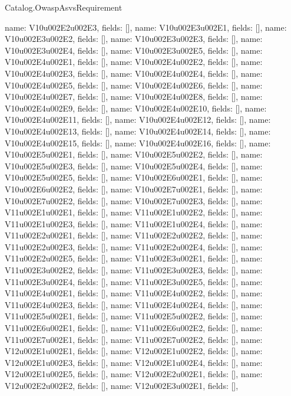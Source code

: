 \begin{lexlean}{Catalog.OwaspAsvsRequirement}
\begin{semanticmodule}
{    {name: V10u002E2u002E3, fields: []},
    {name: V10u002E3u002E1, fields: []},
    {name: V10u002E3u002E2, fields: []},
    {name: V10u002E3u002E3, fields: []},
    {name: V10u002E3u002E4, fields: []},
    {name: V10u002E3u002E5, fields: []},
    {name: V10u002E4u002E1, fields: []},
    {name: V10u002E4u002E2, fields: []},
    {name: V10u002E4u002E3, fields: []},
    {name: V10u002E4u002E4, fields: []},
    {name: V10u002E4u002E5, fields: []},
    {name: V10u002E4u002E6, fields: []},
    {name: V10u002E4u002E7, fields: []},
    {name: V10u002E4u002E8, fields: []},
    {name: V10u002E4u002E9, fields: []},
    {name: V10u002E4u002E10, fields: []},
    {name: V10u002E4u002E11, fields: []},
    {name: V10u002E4u002E12, fields: []},
    {name: V10u002E4u002E13, fields: []},
    {name: V10u002E4u002E14, fields: []},
    {name: V10u002E4u002E15, fields: []},
    {name: V10u002E4u002E16, fields: []},
    {name: V10u002E5u002E1, fields: []},
    {name: V10u002E5u002E2, fields: []},
    {name: V10u002E5u002E3, fields: []},
    {name: V10u002E5u002E4, fields: []},
    {name: V10u002E5u002E5, fields: []},
    {name: V10u002E6u002E1, fields: []},
    {name: V10u002E6u002E2, fields: []},
    {name: V10u002E7u002E1, fields: []},
    {name: V10u002E7u002E2, fields: []},
    {name: V10u002E7u002E3, fields: []},
    {name: V11u002E1u002E1, fields: []},
    {name: V11u002E1u002E2, fields: []},
    {name: V11u002E1u002E3, fields: []},
    {name: V11u002E1u002E4, fields: []},
    {name: V11u002E2u002E1, fields: []},
    {name: V11u002E2u002E2, fields: []},
    {name: V11u002E2u002E3, fields: []},
    {name: V11u002E2u002E4, fields: []},
    {name: V11u002E2u002E5, fields: []},
    {name: V11u002E3u002E1, fields: []},
    {name: V11u002E3u002E2, fields: []},
    {name: V11u002E3u002E3, fields: []},
    {name: V11u002E3u002E4, fields: []},
    {name: V11u002E3u002E5, fields: []},
    {name: V11u002E4u002E1, fields: []},
    {name: V11u002E4u002E2, fields: []},
    {name: V11u002E4u002E3, fields: []},
    {name: V11u002E4u002E4, fields: []},
    {name: V11u002E5u002E1, fields: []},
    {name: V11u002E5u002E2, fields: []},
    {name: V11u002E6u002E1, fields: []},
    {name: V11u002E6u002E2, fields: []},
    {name: V11u002E7u002E1, fields: []},
    {name: V11u002E7u002E2, fields: []},
    {name: V12u002E1u002E1, fields: []},
    {name: V12u002E1u002E2, fields: []},
    {name: V12u002E1u002E3, fields: []},
    {name: V12u002E1u002E4, fields: []},
    {name: V12u002E1u002E5, fields: []},
    {name: V12u002E2u002E1, fields: []},
    {name: V12u002E2u002E2, fields: []},
    {name: V12u002E3u002E1, fields: []},
}
\end{semanticmodule}
\end{lexlean}
